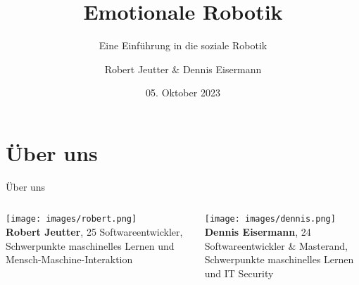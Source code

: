 \documentclass[aspectratio=169]{beamer}
\title{Emotionale Robotik}
\subtitle{Eine Einführung in die soziale Robotik}
\author{Robert Jeutter \& Dennis Eisermann}
\date{05. Oktober 2023}
\begin{document}
\maketitle

\section{Über uns}
\begin{frame}{Über uns}
  \begin{columns}
    \begin{column}{0.4\textwidth}
      \texttt{[image: images/robert.png]}\\
      \textbf{Robert Jeutter}, 25 \arabar{}
      Softwareentwickler,\\
      \scriptsize{Schwerpunkte maschinelles Lernen und Mensch-Maschine-Interaktion}
    \end{column}
    \begin{column}{0.4\textwidth}
      \texttt{[image: images/dennis.png]}\\
      \textbf{Dennis Eisermann}, 24 \arabar{}
      Softwareentwickler \& Masterand,\\
      \scriptsize{Schwerpunkte maschinelles Lernen und IT Security}
    \end{column}
  \end{columns}
\end{frame}
\end{document}
